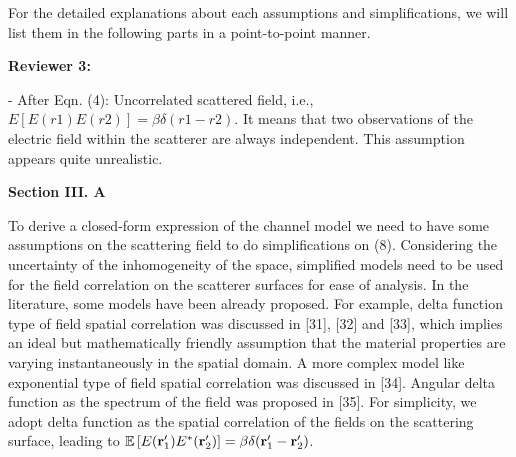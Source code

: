 \documentclass[a4paper,12pt]{article}
\begin{document}
{{\color{blue}For the detailed explanations about each assumptions and simplifications, we will list them in the following parts in a point-to-point manner.
}}

\textbf{Reviewer 3:}

-   After Eqn. (4): Uncorrelated scattered field, i.e., $E[E(r1)E(r2)] = \beta \delta(r1-r2)$. It means that two observations of the electric field within the scatterer are always independent. This assumption appears quite unrealistic.

{}

\begin{framed}
	{\bf Section III. A}

    To derive a closed-form expression of the channel model we need to have some assumptions on the scattering field to do simplifications on (8). {\color{red} Considering the uncertainty of the inhomogeneity of the space, simplified models need to be used for the field correlation on the scatterer surfaces for ease of analysis. In the literature, some models have been already proposed. For example, delta function type of field spatial correlation was discussed in [31], [32] and [33], which implies an ideal but mathematically friendly assumption that the material properties are varying instantaneously in the spatial domain. A more complex model like exponential type of field spatial correlation was discussed in [34]. Angular delta function as the spectrum of the field was proposed in [35]. For simplicity, we adopt delta function as the spatial correlation of the fields on the scattering surface, leading to $\mathbb{E}\left[ E({\bf r}_1')E^{*}({\bf r}_2') \right] = \beta \delta({\bf r}_1'-{\bf r}_2')$.}

\end{framed}
\end{document}
